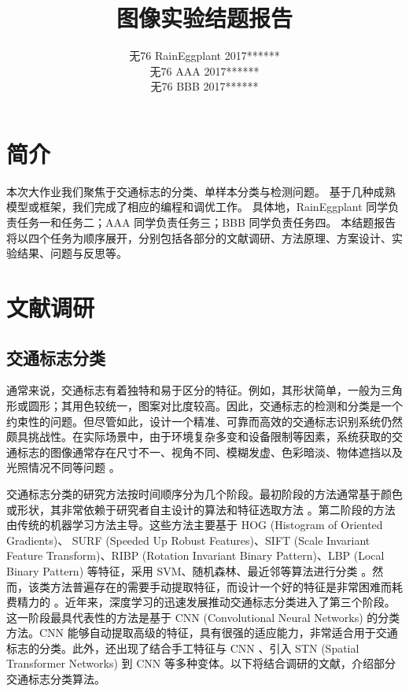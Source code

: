 \documentclass{report}
\title{图像实验结题报告}
\author{无76 \hspace{2ex} RainEggplant \hspace{2ex} 2017****** \\
无76 \hspace{2ex} AAA \hspace{2ex} 2017****** \\
无76 \hspace{2ex} BBB \hspace{2ex} 2017******}
\begin{document}
\maketitle
\tableofcontents
\newpage

\chapter{简介}

本次大作业我们聚焦于交通标志的分类、单样本分类与检测问题。
基于几种成熟模型或框架，我们完成了相应的编程和调优工作。
具体地，RainEggplant 同学负责任务一和任务二；AAA 同学负责任务三；BBB 同学负责任务四。
本结题报告将以四个任务为顺序展开，分别包括各部分的文献调研、方法原理、方案设计、实验结果、问题与反思等。

\chapter{文献调研}

\section{交通标志分类} \label{sec:classification}
通常来说，交通标志有着独特和易于区分的特征。例如，其形状简单，一般为三角形或圆形；其用色较统一，图案对比度较高。因此，交通标志的检测和分类是一个约束性的问题。但尽管如此，设计一个精准、可靠而高效的交通标志识别系统仍然颇具挑战性。在实际场景中，由于环境复杂多变和设备限制等因素，系统获取的交通标志的图像通常存在尺寸不一、视角不同、模糊发虚、色彩暗淡、物体遮挡以及光照情况不同等问题 \cite{STN-CNN}。

交通标志分类的研究方法按时间顺序分为几个阶段。最初阶段的方法通常基于颜色或形状，其非常依赖于研究者自主设计的算法和特征选取方法 \cite{STN-CNN}。第二阶段的方法由传统的机器学习方法主导。这些方法主要基于 HOG (Histogram of Oriented Gradients)、 SURF (Speeded Up Robust Features)、SIFT (Scale Invariant Feature Transform)、RIBP (Rotation Invariant Binary Pattern)、LBP (Local Binary Pattern) 等特征，采用 SVM、随机森林、最近邻等算法进行分类 \cite{STN-CNN,MTCNN,HOG-SURF}。然而，该类方法普遍存在的需要手动提取特征，而设计一个好的特征是非常困难而耗费精力的 \cite{MTCNN}。近年来，深度学习的迅速发展推动交通标志分类进入了第三个阶段。这一阶段最具代表性的方法是基于 CNN (Convolutional Neural Networks) 的分类方法。CNN 能够自动提取高级的特征，具有很强的适应能力，非常适合用于交通标志的分类。此外，还出现了结合手工特征与 CNN \cite{HOG-SURF}、引入 STN (Spatial Transformer Networks) 到 CNN \cite{STN-CNN} 等多种变体。以下将结合调研的文献，介绍部分交通标志分类算法。
\end{document}
